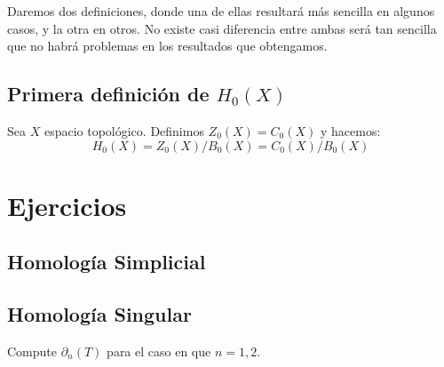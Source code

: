 \documentclass[12pt]{report}
\theoremstyle{largebreak}
\begin{document}
    Daremos dos definiciones, donde una de ellas resultará más sencilla en algunos casos, y la otra en otros. No existe casi diferencia entre ambas será tan sencilla que no habrá problemas en los resultados que obtengamos.

    \subsection{Primera definición de $H_0(X)$}

    \begin{mydef}
        Sea $X$ espacio topológico. Definimos $Z_0(X)=C_0(X)$ y hacemos:
        \begin{equation*}
            H_0(X)=Z_0(X)/B_0(X)=C_0(X)/B_0(X)
        \end{equation*}
    \end{mydef}
    
    \newpage

    \section{Ejercicios}

    \subsection{Homología Simplicial}

    \subsection{Homología Singular}

    \begin{excer}
        Compute $\partial_n(T)$ para el caso en que $n=1,2$.
    \end{excer}
\end{document}
